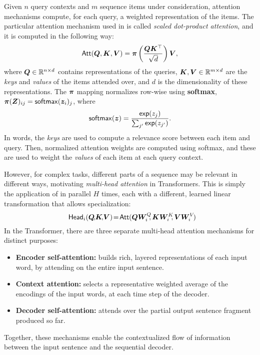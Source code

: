Given $n$ query contexts and $m$ sequence items under consideration,
attention mechanisms compute, for each query, a weighted
representation of the items. The particular attention mechanism used
in \citet{vaswani2017attention} is called \emph{scaled dot-product
    attention}, and it is computed in the following way:
%
\begin{equation}
    \operatorname{\mathsf{Att}}(\bm{Q}, \bm{K}, \bm{V}) = \bm{\pi}
    \left(\frac{\bm{Q}\bm{K}^\top}{\sqrt{d}}\right) \bm{V},
    \label{eq:att_scaled_dot}
\end{equation}
%
where $\bm{Q} \in \mathbb{R}^{n \times d}$ contains representations of the
queries, $\bm{K}, \bm{V} \in \mathbb{R}^{m \times d}$
are the \emph{keys} and \emph{values} of the items attended over,
and $d$ is the dimensionality of these
representations.
The $\bm{\pi}$ mapping normalizes row-wise using \textbf{softmax},
$\bm{\pi}(\bm{Z})_{ij} = \operatorname*{\mathsf{softmax}}(\bm{z}_i)_j$, where
%
\begin{equation}\label{eq:softmax}
    \operatorname*{\mathsf{softmax}}(\bm{z}) = \frac{\operatorname*{\mathsf{exp}}(z_j)}{\sum_{j'} \operatorname*{\mathsf{exp}}(z_{j'})}.
\end{equation}
%
In words, the \emph{keys} are used to compute a relevance score
between each item and query. Then, normalized attention weights are computed
using softmax, and these are used to weight the \emph{values} of each item at each
query context.

However, for complex tasks, different parts of a sequence may be relevant in
different ways, motivating \emph{multi-head attention} in Transformers.
This is simply the application of
 in parallel $H$ times, each with a different,
learned linear transformation that allows specialization:
%
\begin{equation}\label{eq:head}%
    \hspace{-.01ex}%
    \ath_i(\bm{Q}\!,\!\bm{K}\!,\!\bm{V})\!=\!\att(\bm{QW}_i^Q\!\!,\bm{KW}_i^K\!\!,\bm{VW}_i^V\!)%
    \hspace{-1.5ex}%
\end{equation}
%
In the Transformer, there are three separate multi-head attention mechanisms for
distinct purposes:
\begin{itemize}
    \item \textbf{Encoder self-attention:} builds rich, layered representations of
          each input word, by attending on the entire input sentence.
    \item \textbf{Context attention:} selects
          a representative weighted average of the encodings of the input words, at each
          time step of the decoder.
    \item \textbf{Decoder self-attention:} attends over the partial output sentence
          fragment produced so far.
\end{itemize}
Together, these mechanisms enable the contextualized flow of information between
the input sentence and the sequential decoder.

